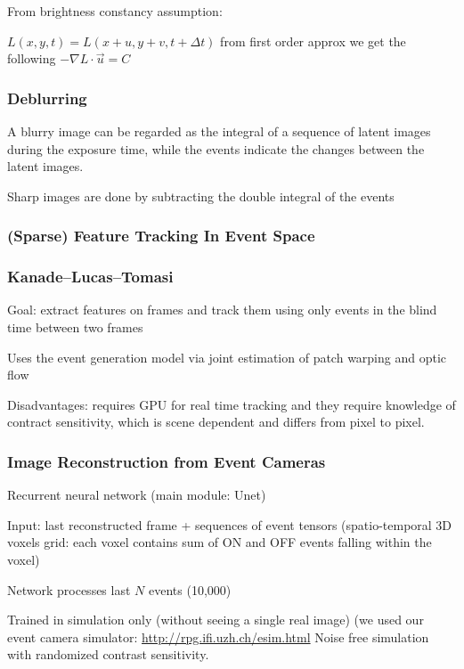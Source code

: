 From brightness constancy assumption:

$L(x,y,t) = L(x+u,y+v,t+\Delta t)$ from first order approx we get the following $-\nabla L \cdot \vec u = C$

\subsubsection{Deblurring}

A blurry image can be regarded as the integral of a sequence of latent images during the exposure time, while the events indicate the changes between the latent images.

Sharp images are done by subtracting the double integral of the events

\subsubsection{(Sparse) Feature Tracking In Event Space}

\subsubsection{Kanade–Lucas–Tomasi}

Goal: extract features on frames and track them using only events in the blind time between two frames

Uses the event generation model via joint estimation of patch warping and optic flow

Disadvantages: requires GPU for real time tracking and they require knowledge of contract sensitivity, which is scene dependent and differs from pixel to pixel.	

\subsubsection{Image Reconstruction from Event Cameras}

Recurrent neural network (main module: Unet) 

Input: last reconstructed frame + sequences of event tensors (spatio-temporal 3D voxels grid: each voxel contains sum of ON and OFF events falling within the voxel)

Network processes last $N$ events (10,000) 

Trained in simulation only (without seeing a single real image) (we used our event camera simulator: \url{http://rpg.ifi.uzh.ch/esim.html} Noise free simulation with randomized contrast sensitivity.
